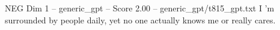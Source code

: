 \begin{textsample}{NEG Dim 1 – generic\_gpt – Score 2.00 – generic\_gpt/t815\_gpt.txt}  \label{ex:f1_neg_040}
I ’m surrounded by people daily, yet no one actually knows me or really cares.

\end{textsample}
